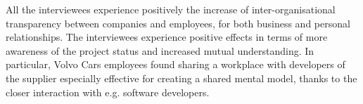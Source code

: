 %
%
%
%
%
%
%
%


 All the interviewees experience positively the increase of inter-organisational transparency between companies and employees, for both business and personal relationships. The interviewees experience positive effects in terms of more awareness of the project status and increased mutual understanding. In particular, Volvo Cars employees found sharing a workplace with developers of the supplier especially effective for creating a shared mental model, thanks to the closer interaction with e.g. software developers.

